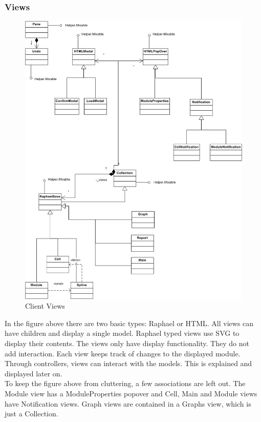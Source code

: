 \documentclass{report}
\begin{document}
				\subsubsection{Views}
					\begin{figure}[htb]
						\begin{center}
							\includegraphics[scale=0.675]{views.png}
							\caption{Client Views}
							\label{fig: cmodels}
						\end{center}
					\end{figure}	
					In the figure above there are two basic types: Raphael or HTML. All views can have children and display a single model. Raphael typed views use SVG to display their contents. The views only have display functionality. They do not add interaction. Each view keeps track of changes to the displayed module. Through controllers, views can interact with the models. This is explained and displayed later on. \\
					To keep the figure above from cluttering, a few associations are left out. The Module view has a ModuleProperties popover and Cell, Main and Module views have Notification views. Graph views are contained in a Graphs view, which is just a Collection.
					
\end{document}
